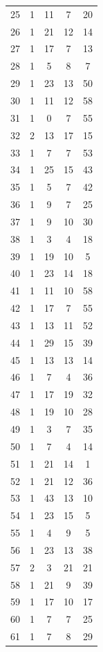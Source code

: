 \documentclass[12pt,a4paper]{report}
\begin{document}
\begin{appendices}
\begin{longtable}{lcccc}
25  &   1 &  11 &   7 &  20 \\
26  &   1 &  21 &  12 &  14 \\
27  &   1 &  17 &   7 &  13 \\
28  &   1 &   5 &   8 &   7 \\
29  &   1 &  23 &  13 &  50 \\
30  &   1 &  11 &  12 &  58 \\
31  &   1 &   0 &   7 &  55 \\
32  &   2 &  13 &  17 &  15 \\
33  &   1 &   7 &   7 &  53 \\
34  &   1 &  25 &  15 &  43 \\
35  &   1 &   5 &   7 &  42 \\
36  &   1 &   9 &   7 &  25 \\
37  &   1 &   9 &  10 &  30 \\
38  &   1 &   3 &   4 &  18 \\
39  &   1 &  19 &  10 &   5 \\
40  &   1 &  23 &  14 &  18 \\
41  &   1 &  11 &  10 &  58 \\
42  &   1 &  17 &   7 &  55 \\
43  &   1 &  13 &  11 &  52 \\
44  &   1 &  29 &  15 &  39 \\
45  &   1 &  13 &  13 &  14 \\
46  &   1 &   7 &   4 &  36 \\
47  &   1 &  17 &  19 &  32 \\
48  &   1 &  19 &  10 &  28 \\
49  &   1 &   3 &   7 &  35 \\
50  &   1 &   7 &   4 &  14 \\
51  &   1 &  21 &  14 &   1 \\
52  &   1 &  21 &  12 &  36 \\
53  &   1 &  43 &  13 &  10 \\
54  &   1 &  23 &  15 &   5 \\
55  &   1 &   4 &   9 &   5 \\
56  &   1 &  23 &  13 &  38 \\
57  &   2 &   3 &  21 &  21 \\
58  &   1 &  21 &   9 &  39 \\
59  &   1 &  17 &  10 &  17 \\
60  &   1 &   7 &   7 &  25 \\
61  &   1 &   7 &   8 &  29 \\

\end{longtable}
\end{appendices}
\end{document}
